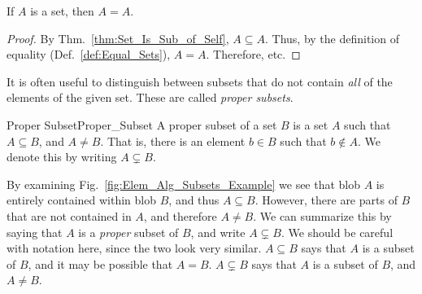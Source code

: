             \begin{theorem}
                If $A$ is a set, then $A=A$.
            \end{theorem}
            \begin{proof}
                By Thm.~\ref{thm:Set_Is_Sub_of_Self},
                $A\subseteq{A}$. Thus, by the definition of
                equality (Def.~\ref{def:Equal_Sets}),
                $A=A$. Therefore, etc.
            \end{proof}
            It is often useful to distinguish between subsets
            that do not contain \textit{all} of the elements of
            the given set. These are called \textit{proper subsets}.
            \begin{ldefinition}{Proper Subset}{Proper_Subset}
                A proper subset of a set $B$ is a set $A$ such that
                $A\subseteq{B}$, and $A\ne{B}$. That is, there is
                an element $b\in{B}$ such that $b\notin{A}$. We
                denote this by writing $A\subsetneq{B}$.
            \end{ldefinition}
            By examining Fig.~\ref{fig:Elem_Alg_Subsets_Example}
            we see that blob $A$ is entirely contained within blob $B$,
            and thus $A\subseteq{B}$. However, there are parts of $B$
            that are not contained in $A$, and therefore $A\ne{B}$. We can
            summarize this by saying that $A$ is a \textit{proper} subset
            of $B$, and write $A\subsetneq{B}$. We should be careful with
            notation here, since the two look very similar. $A\subseteq{B}$
            says that $A$ is a subset of $B$, and it may be possible that
            $A=B$. $A\subsetneq{B}$ says that $A$ is a subset of
            $B$, and $A\ne{B}$.
